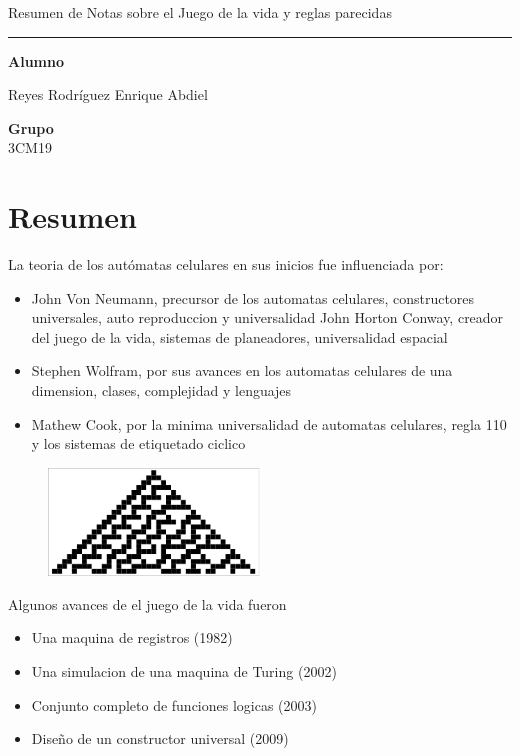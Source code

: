 \documentclass[10pt]{article}
\newcommand{\HRule}{\textcolor{blueTitle}{\rule{\linewidth}{0.5mm}}}
\begin{document}
\begin{center}
{        Resumen de Notas sobre el Juego de la vida y reglas parecidas}
        \HRule
        \vspace{1.5cm}

        \Large
        \textbf{Alumno} \\
        \vspace{.3cm}
       
        Reyes Rodríguez Enrique Abdiel\\
        \vspace{.3cm}
        \vspace{1cm}

        \Large
        \textbf{Grupo} \\
        \vspace{.3cm}
        3CM19
        \vspace{1cm}

    \end{center}
    
    \newpage
    \tableofcontents
    \newpage
    \section{Resumen}
        	
        La teoria de los autómatas celulares en sus inicios fue influenciada por: \\
        \begin{itemize}
            \item John Von Neumann, precursor de los automatas celulares, constructores universales, auto reproduccion y universalidad
            John Horton Conway, creador del juego de la vida, sistemas de planeadores, universalidad espacial
            \item Stephen Wolfram, por sus avances en los automatas celulares de una dimension, clases, complejidad y lenguajes
            \item Mathew Cook, por la minima universalidad de automatas celulares, regla 110 y los sistemas de etiquetado ciclico
        \end{itemize}

    \begin{figure}[h!]
        \centering
        \includegraphics[width=0.5\textwidth]{ac.png}
    \end{figure}
Algunos avances de el juego de la vida fueron
    \begin{itemize}
        \item Una maquina de registros (1982)
        \item Una simulacion de una maquina de Turing (2002)
        \item Conjunto completo de funciones logicas (2003)
        \item Diseño de un constructor universal (2009)
    \end{itemize}
\end{document}
